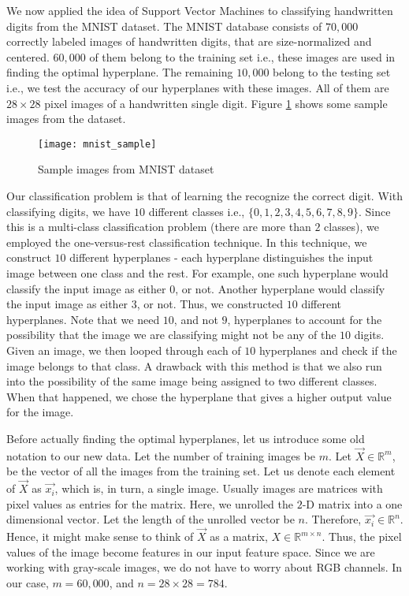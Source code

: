 
We now applied the idea of Support Vector Machines to classifying handwritten digits from the MNIST dataset\cite{mnist}. The MNIST database consists of $70,000$ correctly labeled images of handwritten digits, that are size-normalized and centered. $60,000$ of them belong to the training set i.e., these images are used in finding the optimal hyperplane. The remaining $10,000$ belong to the testing set i.e., we test the accuracy of our hyperplanes with these images. All of them are $28\times28$ pixel images of a handwritten single digit. Figure \ref{fig:mnist} shows some sample images from the dataset.

\begin{figure}[!tb]
	\texttt{[image: mnist\_sample]}
	\centering
	\caption{Sample images from MNIST dataset}
	\label{fig:mnist}
\end{figure}

Our classification problem is that of learning the recognize the correct digit. With classifying digits, we have $10$ different classes i.e., $\{0, 1, 2, 3, 4, 5, 6, 7, 8, 9\}$. Since this is a multi-class classification problem (there are more than $2$ classes), we employed the one-versus-rest classification technique. In this technique, we construct $10$ different hyperplanes - each hyperplane distinguishes the input image between one class and the rest. For example, one such hyperplane would classify the input image as either $0$, or not. Another hyperplane would classify the input image as either $3$, or not. Thus, we constructed $10$ different hyperplanes. Note that we need $10$, and not $9$, hyperplanes to account for the possibility that the image we are classifying might not be any of the $10$ digits. Given an image, we then looped through each of $10$ hyperplanes and check if the image belongs to that class. A drawback with this method is that we also run into the possibility of the same image being assigned to two different classes. When that happened, we chose the hyperplane that gives a higher output value for the image.

Before actually finding the optimal hyperplanes, let us introduce some old notation to our new data. Let the number of training images be $m$. Let $\vec{X}\in\mathbb{R}^{m}$, be the vector of all the images from the training set. Let us denote each element of $\vec{X}$ as $\vec{x_i}$, which is, in turn, a single image. Usually images are matrices with pixel values as entries for the matrix. Here, we unrolled the $2$-D matrix into a one dimensional vector. Let the length of the unrolled vector be $n$. Therefore, $\vec{x_i}\in\mathbb{R}^{n}$. Hence, it might make sense to think of $\vec{X}$ as a matrix, $X\in\mathbb{R}^{m \times n}$. Thus, the pixel values of the image become features in our input feature space. Since we are working with gray-scale images, we do not have to worry about RGB channels. In our case, $m = 60,000$, and $n = 28\times28 = 784$.

